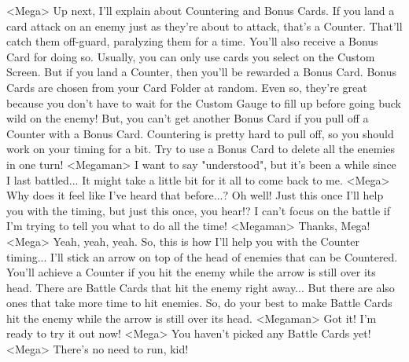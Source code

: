 <Mega> Up next, I'll explain about Countering and Bonus Cards. 
If you land a card attack on an enemy just as they're 
about to attack, that's a Counter. 
That'll catch them off-guard, paralyzing them for a time. 
You'll also receive a Bonus Card for doing so. 
Usually, you can only use cards you select on the Custom Screen. But if you 
land a Counter, then you'll be rewarded a Bonus Card. 
Bonus Cards are chosen from your Card Folder at random. 
Even so, they're great because you don't have to wait for the Custom Gauge 
to fill up before going buck wild on the enemy! 
But, you can't get another Bonus Card if you pull off a Counter with a Bonus Card. 
Countering is pretty hard to pull off, so you should work on your timing for a bit. 
Try to use a Bonus Card to delete all the enemies in one turn! 
<Megaman> I want to say "understood", but it's been a while since I last battled... 
It might take a little bit for it all to come back to me. 
<Mega> Why does it feel like I've heard that before...? 
Oh well! Just this once I'll help you with the timing, but just this once, you hear!? 
I can't focus on the battle if I'm trying to tell you what to do all the time! 
<Megaman> Thanks, Mega! 
<Mega> Yeah, yeah, yeah. So, this is how I'll help you with the Counter timing... 
I'll stick an arrow on top of the head of enemies that can be Countered. 
You'll achieve a Counter if you hit the enemy while the arrow is still over its head. 
There are Battle Cards that hit the enemy right away... 
But there are also ones that take more time to hit enemies. 
So, do your best to make Battle Cards hit the enemy 
while the arrow is still over its head. 
<Megaman> Got it! I'm ready to try it out now! 
<Mega> You haven't picked any Battle Cards yet! 
<Mega> There's no need to run, kid! 
